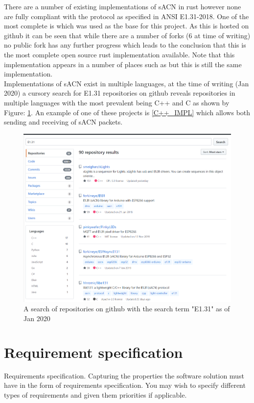 \documentclass[11pt,a4paper]{report}
\begin{document}
There are a number of existing implementations of sACN in rust however none are fully compliant with the protocol as specified in ANSI E1.31-2018. One of the most complete is \cite{ORIGNIAL_IMPL} which was used as the base for this project. As this is hosted on github it can be seen that while there are a number of forks (6 at time of writing) no public fork has any further progress which leads to the conclusion that this is the most complete open source rust implementation available. Note that this implementation appears in a number of places such as \cite{ORIGINAL_IMPL_RUST_DOC} but this is still the same implementation.\\
	
Implementations of sACN exist in multiple languages, at the time of writing (Jan 2020) a cursory search for E1.31 repositories on github reveals repositories in multiple languages with the most prevalent being C++ and C as shown by Figure: \ref{E131_REPO_SEARCH}. An example of one of these projects is \ref{C++_IMPL} which allows both sending and receiving of sACN packets.
	
	\begin{figure}
		\label{E131_REPO_SEARCH}
		\includegraphics[width=\textwidth]{E131-Repo-Search}
		\caption{A search of repositories on github with the search term "E1.31" as of Jan 2020}
	\end{figure}

\section{Requirement specification}
Requirements specification. Capturing the properties the software solution must
	have in the form of requirements specification. You
	may wish to specify different types of requirements and
	given them priorities if applicable.
	
\end{document}
